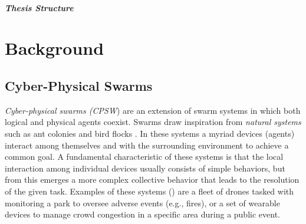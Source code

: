 \documentclass[12pt,a4paper,openright,twoside]{book}
\begin{document}
%
\paragraph{Thesis Structure} 


\chapter{Background}
\label{chap:background}

\section{Cyber-Physical Swarms}

\emph{Cyber-physical swarms (CPSW}) are an extension of swarm systems in which both logical and
    physical agents coexist. Swarms draw inspiration from \emph{natural systems} such as ant colonies 
    and bird flocks \cite{tan2013swarm, roy2014nature, bonabeau1999swarm}. In these systems a myriad devices (agents) interact among themselves and with the surrounding 
    environment to achieve a common goal. A fundamental characteristic of these systems is that the local 
    interaction among individual devices usually consists of simple behaviors, but from this emerges a more 
    complex collective behavior that leads to the resolution of the given task. Examples of these systems () are a fleet of drones tasked with monitoring a park to 
    oversee adverse events (e.g., fires), or a set of wearable devices to manage crowd congestion in a specific area during a public event.
\end{document}
